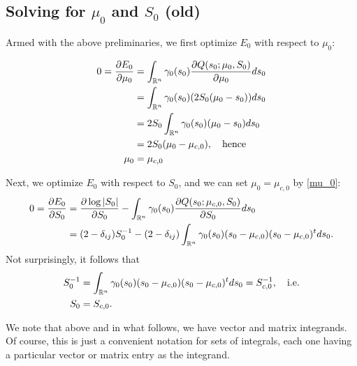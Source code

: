 \documentclass[12pt,leqno]{article}
\begin{document}
  \subsection{Solving for $\mu_0$ and $S_0$ (old)}

Armed with the above preliminaries, we first optimize $E_0$ with respect to $\mu_0$: 
 
\begin{align}
0 = \frac{\partial{E_0}}{\partial{\mu_0}} &= \int_{{\mathbb R}^n}\gamma_0(s_0)\frac{\partial{Q(s_0;\mu_0,S_0)}}{\partial{\mu_0}}ds_0 \notag\\
&= \int_{{\mathbb R}^n}\gamma_0(s_0)(2S_0(\mu_0-s_0))ds_0\notag\\
&= 2S_0\int_{{\mathbb R}^n}\gamma_0(s_0)(\mu_0-s_0)ds_0 \notag\\
&= 2S_0(\mu_0-\mu_{c,0}), \quad\text{hence}\notag\\
\mu_0 &= \mu_{c,0}
\end{align}

Next, we optimize $E_0$ with respect to $S_0$, and we can set $\mu_0 = \mu_{c,0}$ by \eqref{mu_0}:
\begin{align*}
  0 = \frac{\partial{E_0}}{\partial{S_0}} &= \frac{\partial\log|S_0|}{\partial{S_0}}
  -\int_{{\mathbb R}^n}\gamma_0(s_0)\frac{\partial{Q(s_0;\mu_{c,0},S_0)}}{\partial{S_0}}ds_0 \\
&= (2-\delta_{ij})S_0^{-1} - (2-\delta_{ij})\int_{{\mathbb R}^n}\gamma_0(s_0)(s_0-\mu_{c,0})(s_0-\mu_{c,0})^tds_0.
\end{align*}
Not surprisingly, it follows that
\begin{equation}\label{Sigma_0}
  \begin{split}
    S_0^{-1} &= \int_{{\mathbb R}^n}\gamma_0(s_0)(s_0-\mu_{c,0})(s_0-\mu_{c,0})^tds_0 = S_{c,0}^{-1}, \quad\text{i.e.}\\
    S_0 &= S_{c,0}.
  \end{split}
\end{equation}

We note that above and in what follows, we have vector and matrix integrands.  Of course, this is just a convenient
notation for sets of integrals, each one having a particular vector or matrix entry as the integrand.
\end{document}
